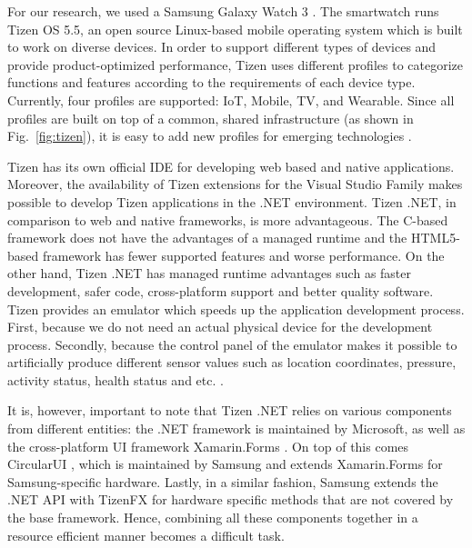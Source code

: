 \documentclass[conference, a4paper, 10pt, twocolumn]{IEEEtran}
\begin{document}
For our research, we used a Samsung Galaxy Watch 3 \cite{galaxyWatch3}. The smartwatch runs Tizen OS 5.5, an open source Linux-based mobile operating system which is built to work on diverse devices. In order to support different types of devices and provide product-optimized performance, Tizen uses different profiles to categorize functions and features according to the requirements of each device type. Currently, four profiles are supported: IoT, Mobile, TV, and Wearable. Since all profiles are built on top of a common, shared infrastructure (as shown in Fig.~\ref{fig:tizen}), it is easy to add new profiles for emerging technologies \cite{tizen}.

Tizen has its own official IDE for developing web based and native applications. Moreover, the availability of Tizen extensions for the Visual Studio Family makes possible to develop Tizen applications in the .NET environment. Tizen .NET, in comparison to web and native frameworks, is more advantageous. The C-based framework does not have the advantages of a managed runtime and the HTML5-based framework has fewer supported features and worse performance. On the other hand, Tizen .NET has managed runtime advantages such as faster development, safer code, cross-platform support and better quality software. Tizen provides an emulator which speeds up the application development process. First, because we do not need an actual physical device for the development process. Secondly, because the control panel of the emulator makes it possible to artificially produce different sensor values such as location coordinates, pressure, activity status, health status and etc. \cite{tizen}.

It is, however, important to note that Tizen .NET relies on various components from different entities: the .NET framework \cite{dotnet} is maintained by Microsoft, as well as the cross-platform \ac{UI} framework Xamarin.Forms \cite{xamarin}. On top of this comes CircularUI \cite{circularUI}, which is maintained by Samsung and extends Xamarin.Forms for Samsung-specific hardware. Lastly, in a similar fashion, Samsung extends the .NET \ac{API} with TizenFX \cite{tizenFX} for hardware specific methods that are not covered by the base framework. Hence, combining all these components together in a resource efficient manner becomes a difficult task. 
\end{document}
